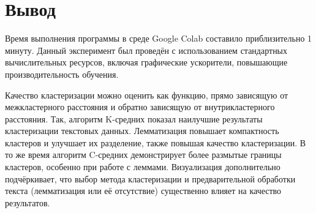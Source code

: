 \section*{Вывод}

Время выполнения программы в среде Google Colab составило приблизительно 1 минуту. Данный эксперимент был проведён с использованием стандартных вычислительных ресурсов, включая графические ускорители, повышающие производительность обучения.

Качество кластеризации можно оценить как функцию, прямо зависящую от межкластерного расстояния и обратно зависящую от внутрикластерного расстояния. Так, алгоритм K-средних показал наилучшие результаты кластеризации текстовых данных. Лемматизация повышает компактность кластеров и улучшает их разделение, также повышая качество кластеризации. В то же время алгоритм C-средних демонстрирует более размытые границы кластеров, особенно при работе с леммами. Визуализация дополнительно подчёркивает, что выбор метода кластеризации и предварительной обработки текста (лемматизация или её отсутствие) существенно влияет на качество результатов.

\clearpage
